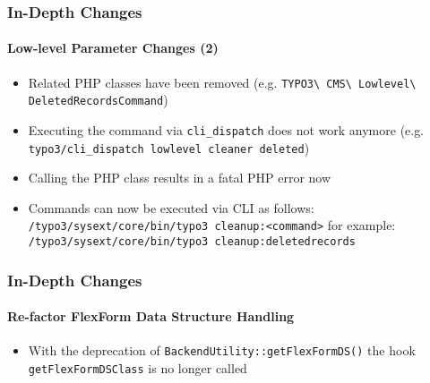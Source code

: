 \begin{frame}[fragile]
	\frametitle{In-Depth Changes}
	\framesubtitle{Low-level Parameter Changes (2)}


	\begin{itemize}
		\item Related PHP classes have been removed\newline
			\smaller(e.g. \texttt{TYPO3\textbackslash
				CMS\textbackslash
				Lowlevel\textbackslash
				DeletedRecordsCommand})
			\normalsize

		\item Executing the command via \texttt{cli\_dispatch} does not work anymore\newline
			\smaller(e.g. \texttt{typo3/cli\_dispatch lowlevel cleaner deleted})\normalsize
		\item Calling the PHP class results in a fatal PHP error now

		\item Commands can now be executed via CLI as follows:\newline
			\smaller\texttt{/typo3/sysext/core/bin/typo3 cleanup:<command>}\normalsize\newline
			for example:\newline
			\smaller\texttt{/typo3/sysext/core/bin/typo3 cleanup:deletedrecords}\normalsize

	\end{itemize}

\end{frame}




\begin{frame}[fragile]
	\frametitle{In-Depth Changes}
	\framesubtitle{Re-factor FlexForm Data Structure Handling}


	\begin{itemize}
		\item With the deprecation of \texttt{BackendUtility::getFlexFormDS()} the hook
			\texttt{getFlexFormDSClass} is no longer called

	\end{itemize}

\end{frame}






